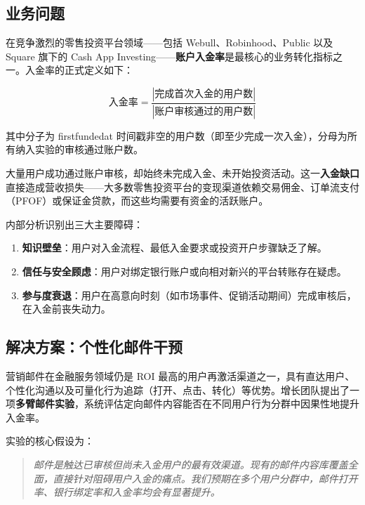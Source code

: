 \documentclass[12pt,a4paper]{ctexart}
\newcommand{\colname}[1]{{\ttfamily\renewcommand{\_}{\textunderscore\allowbreak}#1}}
\begin{document}
\subsection{业务问题}

在竞争激烈的零售投资平台领域——包括 Webull、Robinhood、Public 以及 Square 旗下的 Cash App Investing——\textbf{账户入金率}是最核心的业务转化指标之一。入金率的正式定义如下：

\begin{equation}
  \text{入金率} = \frac{|\text{完成首次入金的用户数}|}{|\text{账户审核通过的用户数}|}
\end{equation}

\noindent 其中分子为 \colname{first\_funded\_at} 时间戳非空的用户数（即至少完成一次入金），分母为所有纳入实验的审核通过账户数。

大量用户成功通过账户审核，却始终未完成入金、未开始投资活动。这一\textbf{入金缺口}直接造成营收损失——大多数零售投资平台的变现渠道依赖交易佣金、订单流支付（PFOF）或保证金贷款，而这些均需要有资金的活跃账户。

内部分析识别出三大主要障碍：

\begin{enumerate}[leftmargin=2em]
  \item \textbf{知识壁垒}：用户对入金流程、最低入金要求或投资开户步骤缺乏了解。
  \item \textbf{信任与安全顾虑}：用户对绑定银行账户或向相对新兴的平台转账存在疑虑。
  \item \textbf{参与度衰退}：用户在高意向时刻（如市场事件、促销活动期间）完成审核后，在入金前丧失动力。
\end{enumerate}

\subsection{解决方案：个性化邮件干预}

营销邮件在金融服务领域仍是 ROI 最高的用户再激活渠道之一，具有直达用户、个性化沟通以及可量化行为追踪（打开、点击、转化）等优势。增长团队提出了一项\textbf{多臂邮件实验}，系统评估定向邮件内容能否在不同用户行为分群中因果性地提升入金率。

实验的核心假设为：

\begin{quote}
  \textit{邮件是触达已审核但尚未入金用户的最有效渠道。现有的邮件内容库覆盖全面，直接针对阻碍用户入金的痛点。我们预期在多个用户分群中，邮件打开率、银行绑定率和入金率均会有显著提升。}
\end{quote}
\end{document}
